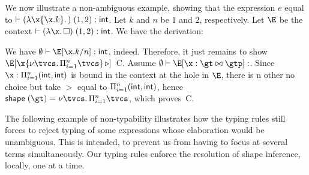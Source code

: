 \documentclass[acmsmall,screen,nonacm]{acmart}
\begin{document}
\begin{example}
\locallabelreset
We now illustrate a non-ambiguous example, showing that the
expression $e$ equal to $\th \eapp {(\efun \x {\eproj
\x  k})} {(1, 2)} : \tint$.
%
Let $k$ and $n$ be $1$ and $2$, respectively.
%
Let $\E$ be the context $\th \eapp {(\efun \x \ehole)} {(1, 2)} : \tint$.  We
have the derivation:
\begin{mathpar}
\end{mathpar}
We have $\eset \th \E \where {\eproj[n] \x k} : \tint$, indeed. Therefore, it
just remains to show $\eshape \E \x {\any \tvcs \Pi\iton \tvcs}$~\llabel C.
Assume $\eset \th \E \where{\ecast \x \gt \gtp} : \t$. Since $\x : \Pi\iton
(\tint, \tint)$  is bound in the context at the hole in $\E$,
  there is n other no choice but take $\gt$ equal to $\Pi\iton (\tint, \tint)$,
hence $\shape \gt = \any \tvcs \Pi\iton \tvcs$, which proves~\lref C.
\end{example}

The following example of non-typability illustrates how the typing rules
still forces to reject typing of some expressions whose elaboration would be
unambiguous. This is intended, to prevent us from having to focus at several
terms simultaneously. Our typing rules enforce the resolution of
shape inference, locally, one at a time.
\end{document}

